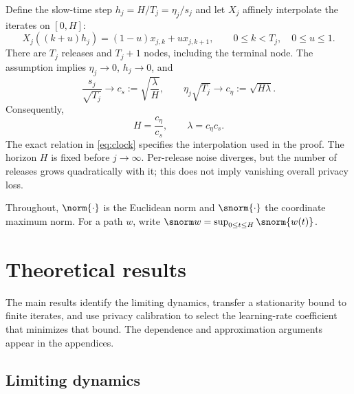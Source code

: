Define the slow-time step $h_j=H/T_j=\eta_j/s_j$ and let $X_j$ affinely
interpolate the iterates on $[0,H]$:
\[
 X_j((k+u)h_j)=(1-u)x_{j,k}+u x_{j,k+1},
 \qquad 0\leq k<T_j,\quad 0\leq u\leq1.
\]
There are $T_j$ releases and $T_j+1$ nodes, including the terminal node.
The assumption implies $\eta_j\to0$, $h_j\to0$, and
\[
 \frac{s_j}{\sqrt{T_j}}\longrightarrow c_s:=\sqrt{\frac{\lambda}{H}},
 \qquad \eta_j\sqrt{T_j}\longrightarrow c_\eta:=\sqrt{H\lambda}.
\]
Consequently,
\[
 H=\frac{c_\eta}{c_s},\qquad\lambda=c_\eta c_s.
\]
The exact relation in \eqref{eq:clock} specifies the interpolation used
in the proof. The horizon $H$ is fixed before $j\to\infty$. Per-release
noise diverges, but the number of releases grows quadratically with it;
this does not imply vanishing overall privacy loss.

Throughout, $\norm{\cdot}$ is the Euclidean norm and $\snorm{\cdot}$
the coordinate maximum norm. For a path $w$, write
$\snorm w=\sup_{0\leq t\leq H}\snorm{w(t)}$.

\section{Theoretical results}

The main results identify the limiting dynamics, transfer a stationarity
bound to finite iterates, and use privacy calibration to select the
learning-rate coefficient that minimizes that bound. The dependence and
approximation arguments appear in the appendices.

\subsection{Limiting dynamics}

